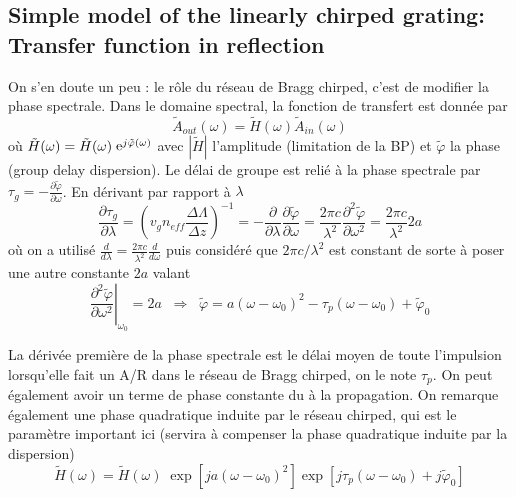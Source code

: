 \subsection{Simple model of the linearly chirped grating: Transfer function in reflection}
On s'en doute un peu : le rôle du réseau de Bragg chirped, c'est de modifier la phase spectrale. 
Dans le domaine spectral, la fonction de transfert est donnée par
\begin{equation}
{\tilde A_{out}}(\omega ) = \tilde H(\omega ){\tilde A_{in}}(\omega )
\end{equation}
où $\tilde H(\omega ) = \tilde H(\omega )\;{{\mathop{\rm e}\nolimits} ^{j\tilde \varphi (\omega )}}$
avec $|\tilde{H}|$ l'amplitude (limitation de la BP) et $\tilde{\varphi}$ la phase (group delay
dispersion). Le délai de groupe est relié à la phase spectrale par ${\tau _g} =  - \frac{{\partial
\tilde \varphi }}{{\partial \omega }}$. En dérivant par rapport à $\lambda$
\begin{equation}
\frac{{\partial {\tau _g}}}{{\partial \lambda }} = {\left( {{v_g}{n_{eff}}\frac{{\Delta \Lambda }}{{\Delta z}}} \right)^{ - 1}} =  - \frac{\partial }{{\partial \lambda }}\frac{{\partial \tilde \varphi }}{{\partial \omega }} = \frac{{2\pi c}}{{{\lambda ^2}}}\frac{{{\partial ^2}\tilde \varphi }}{{\partial {\omega ^2}}} = \frac{{2\pi c}}{{{\lambda ^2}}}2a
\end{equation}
où on a utilisé $\frac{d}{d\lambda} = \frac{2\pi c}{\lambda^2}\frac{d}{d\omega}$ puis considéré
que $2\pi c/\lambda^2$ est constant de sorte à poser une autre constante $2a$ valant
\begin{equation}
{\left. {\frac{{{\partial ^2}\tilde \varphi }}{{\partial {\omega ^2}}}} \right|_{{\omega _0}}} = 2a\;
\; \Rightarrow \;\;\tilde \varphi  = a{(\omega  - {\omega _0})^2} - {\tau _p}(\omega  - {\omega _0})
 + {\tilde \varphi _0}
\end{equation}


La dérivée première de la phase spectrale est le délai moyen de toute l'impulsion lorsqu'elle 
fait un A/R dans le réseau de Bragg chirped, on le note $\tau_p$. On peut également avoir un terme
de phase constante du à la propagation. On remarque également une phase quadratique induite par le
réseau chirped, qui est le paramètre important ici (servira à compenser la phase quadratique induite
par la dispersion)
\begin{equation}
\tilde H(\omega ) = \tilde H(\omega )\;\exp [ja{(\omega  - {\omega _0})^2}]\exp [j{\tau _p}(\omega  -
 {\omega _0}) + j{\tilde \varphi _0}]
\end{equation}

